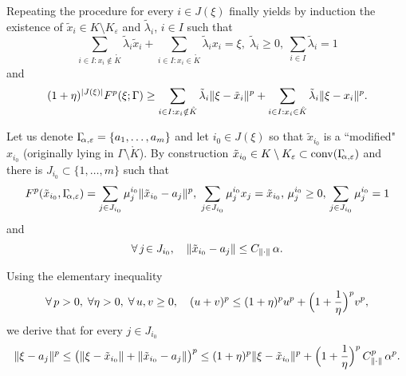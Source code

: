 Repeating the
procedure 
for every $i\!\in J(\xi)$ 
finally yields by induction the existence of $\tilde{x}_i\!\in K\setminus
K_{\varepsilon}$ and  $\tilde \lambda_i$, $i\in I$ such that
 \[ \sum_{i\in I :
x_i\notin \mathring{K}} \tilde \lambda_{i} \tilde x_{i} +\sum_{i\in I : x_i\in
\mathring{K}} \tilde \lambda_i x_i = \xi, \;\tilde \lambda_i \geq 0,
\;\sum_{i\in I} \tilde  \lambda_i = 1 
\] 
and 
\begin{equation}\label{eq:FirewallProofIneq}
(1+\eta)^{|J(\xi)|} \Fp(\xi; \Gamma)\ge \sum_{i\in I :
x_i\notin \mathring{K}} \tilde \lambda_{i} \norm{\xi - \tilde x_{i}}^p
+\sum_{i\in I : x_i\in \mathring{K}} \tilde \lambda_i \norm{\xi -  x_{i}}^p. 
\end{equation}

Let us denote $\Gamma_{\!\!\alpha, \varepsilon} = \{a_1, \ldots, a_m\}$ and let   $i_0\!\in J(\xi)$ so that $\tilde x_{i_0}$ is a
``modified" $x_{i_0}$ (originally lying in $\Gamma\setminus \mathring K$). By
construction $\tilde x_{i_0}\in K \setminus K_\varepsilon\subset\operatorname{conv}(\Gamma_{\!\!\alpha, \varepsilon})$ and there is
$J_{i_0}\subset \{1, \ldots, m\}$ such that 
\[ F^p(\tilde x_{i_0}, \Gamma_{\!\!\alpha, \varepsilon}) =
\sum_{j\in J_{i_0}} \mu^{i_0}_j \lVert\tilde x_{i_0} - a_j\rVert^p, \; \sum_{j\in
J_{i_0}} \mu^{i_0}_j x_j = \tilde x_{i_0},\, \mu^{i_0}_j \geq 0,\, \sum_{j\in
J_{i_0}} \mu^{i_0}_j = 1 
\] 
and 
\[ \forall\, j\!\in J_{i_0},\quad \lVert\tilde
x_{i_0}-a_j\rVert\le C_{\lVert\cdot\rVert}\,\alpha. 
\] 


 \smallskip Using the elementary inequality
\[ 
\forall\,p>0, \; \forall \eta > 0, \;\forall\, u,v \geq 0,\quad (u+v)^p \leq (1+\eta)^p u^p +
\Bigl(1+\frac{1}{\eta} \Bigr)^p v^p, 
\] 
we derive that for every $j\!\in J_{i_0}$
\begin{equation*}
  \lVert\xi - a_j\rVert^p  \leq \bigl( \lVert\xi - \tilde x_{i_0}\rVert + \lVert\tilde
  x_{i_0} - a_j\rVert  \bigr)^p  \leq (1+\eta)^p \lVert\xi - \tilde x_{i_0}\rVert^p + \Bigl(1+\frac{1}{\eta}
  \Bigr)^p\, C^p_{\lVert\cdot\rVert}\, \alpha^p.
\end{equation*}

